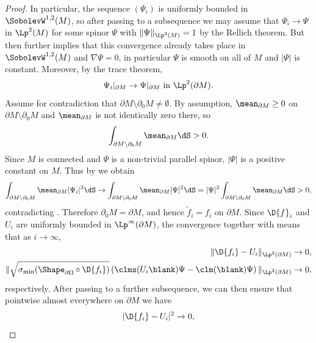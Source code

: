 \documentclass[a4paper,11pt]{amsart}
\numberwithin{equation}{section}
\begin{document}
\begin{proof}
    In particular, the sequence \((\Psi_i)\) is uniformly bounded in \(\SobolevW^{1,2}(M)\), so after passing to a subsequence we may assume that \(\Psi_i \to \Psi\) in \(\Lp^2(M)\) for some spinor \(\Psi\) with \(\| \Psi \|_{\Lp^2(M)} = 1\) by the Rellich theorem.
    But then  further implies that this convergence already takes place in \(\SobolevW^{1,2}(M)\) and \(\nabla \Psi = 0\), in particular \(\Psi\) is smooth on all of \(M\) and \(\lvert \Psi \rvert\) is constant.
     Moreover, by the trace theorem, 
    \begin{equation}
        \Psi_i|_{\partial M} \to \Psi|_{\partial M} \text{ in \(\Lp^2(\partial M)\).} \label{eq:boundary_convergence}
    \end{equation}
    Assume for contradiction that \(\partial M \setminus \partial_0 M \neq \emptyset\).
    By assumption, \(\mean_{\partial M} \geq 0\) on \(\partial M \setminus \partial_0 M\) and \(\mean_{\partial M}\) is not identically zero there, so
    \[
        \int_{\partial M \setminus \partial_0 M}\mean_{\partial M}\dS > 0.
    \]
    Since \(M\) is connected and \(\Psi\) is a non-trivial parallel spinor, \(|\Psi|\) is a positive constant on \(M\).
    Thus by  we obtain
    \[
        \int_{\partial M \setminus \partial_0 M}\mean_{\partial M}|\Psi_i|^2\dS
        \to
        \int_{\partial M \setminus \partial_0 M}\mean_{\partial M}|\Psi|^2\dS
        =
        |\Psi|^2\int_{\partial M \setminus \partial_0 M}\mean_{\partial M}\dS > 0,
    \]
    contradicting .
    Therefore \(\partial_0 M = \partial M\), and hence \(\tilde f_i = f_i\) on \(\partial M\).
    Since \(\D{f}_i\) and \(U_i\) are uniformly bounded in \(\Lp^\infty(\partial M)\), the convergence  together with  means that as \(i \to \infty\),
    \begin{align*}
        \|\D{f_i} - U_i \|_{\Lp^2(\partial M)} &\to 0, \\
        \| \sqrt{\sigma_{\min}(\Shape_{\partial\Omega} \circ \D{f_i})} \left( \clms(U_i \blank) \Psi - \clm(\blank)\Psi \right)\|_{\Lp^2(\partial M)} &\to 0, 
    \end{align*}
    respectively.
    After passing to a further subsequence, we can then ensure that pointwise almost everywhere on \(\partial M\) we have
    \begin{align}
        |\D{f_i} - U_i |^2 &\to 0, \label{eq:differential_close_to_isometry}\\

\end{align}
\end{proof}
\end{document}
